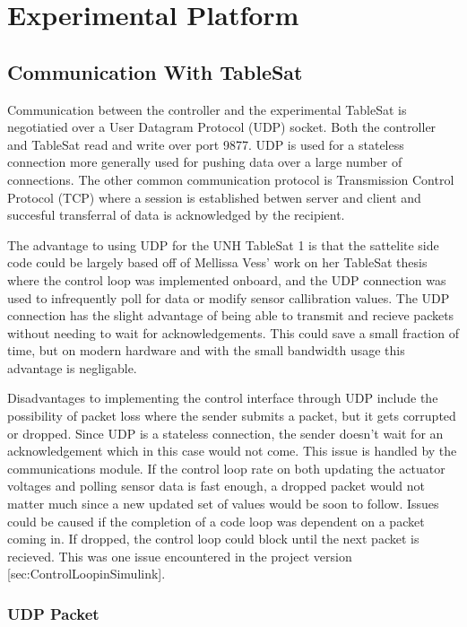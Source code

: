 
\chapter{Experimental Platform}
\label{chap:Experimental Platform}

\section{Communication With TableSat}
\label{sec:CommunicationWithTableSat}

Communication between the controller and the experimental TableSat is
negotiatied over a User Datagram Protocol (UDP) socket.  Both the
controller and TableSat read and write over port 9877.  UDP is used for
a stateless connection more generally used for pushing data over a
large number of connections.  The other common communication protocol
is Transmission Control Protocol (TCP) where a session is established
betwen server and client and succesful transferral of data is
acknowledged by the recipient.

The advantage to using UDP for the UNH TableSat 1 is that the sattelite
side code could be largely based off of Mellissa Vess' work on her
TableSat thesis where the control loop was implemented onboard, and
the UDP connection was used to infrequently poll for data or modify
sensor callibration values.  The UDP connection has the slight advantage
of being able to transmit and recieve packets without needing to wait for
acknowledgements.  This could save a small fraction of time, but on modern
hardware and with the small bandwidth usage this advantage is negligable.

Disadvantages to implementing the control interface through UDP include
the possibility of packet loss where the sender submits a packet, but
it gets corrupted or dropped.  Since UDP is a stateless connection, the
sender doesn't wait for an acknowledgement which in this case would not come.
This issue is handled by the communications module.  If the control loop rate
on both updating the actuator voltages and polling sensor data is fast enough,
a dropped packet would not matter much since a new updated set of values
would be soon to follow.  Issues could be caused if the completion of a
code loop was dependent on a packet coming in.  If dropped, the control
loop could block until the next packet is recieved.  This was one issue
encountered in the project version [sec:ControlLoopinSimulink].


\subsection{UDP Packet}

